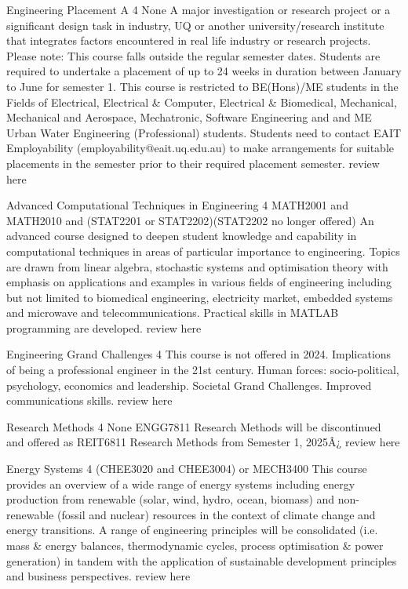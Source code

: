	{Engineering Placement A}
	{4}
	{None}
	{}
	{}
	{A major investigation or research project or a significant design task in industry, UQ or another university/research institute that integrates factors encountered in real life industry or research projects. Please note: This course falls outside the regular semester dates. Students are required to undertake a placement of up to 24 weeks in duration between January to June for semester 1. This course is restricted to BE(Hons)/ME students in the Fields of Electrical, Electrical & Computer, Electrical & Biomedical, Mechanical, Mechanical and Aerospace, Mechatronic, Software Engineering and and ME Urban Water Engineering (Professional) students. Students need to contact EAIT Employability (employability@eait.uq.edu.au) to make arrangements for suitable placements in the semester prior to their required placement semester.}
	{review here}

	{Advanced Computational Techniques in Engineering}
	{4}
	{MATH2001 and MATH2010 and (STAT2201 or STAT2202)(STAT2202 no longer offered)}
	{}
	{}
	{An advanced course designed to deepen student knowledge and capability in computational techniques in areas of particular importance to engineering. Topics are drawn from linear algebra, stochastic systems and optimisation theory with emphasis on applications and examples in various fields of engineering including but not limited to biomedical engineering, electricity market, embedded systems and microwave and telecommunications. Practical skills in MATLAB programming are developed.}
	{review here}

	{Engineering Grand Challenges}
	{4}
	{}
	{}
	{}
	{This course is not offered in 2024. Implications of being a professional engineer in the 21st century. Human forces: socio-political, psychology, economics and leadership. Societal Grand Challenges. Improved communications skills.}
	{review here}

	{Research Methods}
	{4}
	{None}
	{}
	{}
	{ENGG7811 Research Methods will be discontinued and offered as REIT6811 Research Methods from Semester 1, 2025Â¿}
	{review here}

	{Energy Systems}
	{4}
	{(CHEE3020 and CHEE3004) or MECH3400}
	{}
	{}
	{This course provides an overview of a wide range of energy systems including energy production from renewable (solar, wind, hydro, ocean, biomass) and non-renewable (fossil and nuclear) resources in the context of climate change and energy transitions. A range of engineering principles will be consolidated (i.e. mass & energy balances, thermodynamic cycles, process optimisation & power generation) in tandem with the application of sustainable development principles and business perspectives.}
	{review here}

